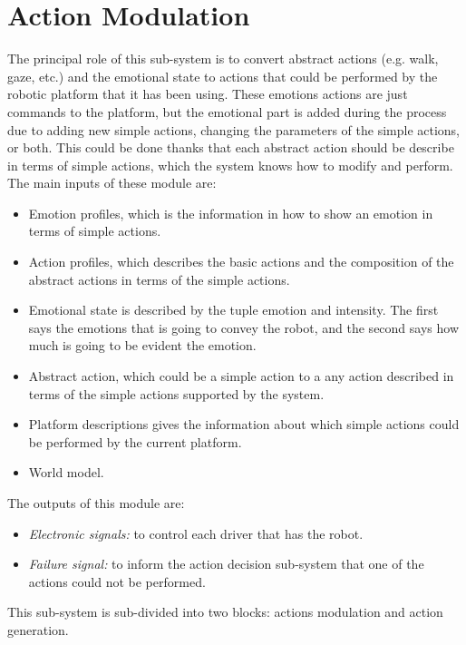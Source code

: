\section{Action Modulation}
The principal role of this sub-system is to convert abstract actions (e.g. walk, gaze, etc.) and the emotional state to actions that could be performed by the robotic platform that it has been using. These emotions actions are just commands to the platform, but the emotional part is added during the process due to adding new simple actions, changing the parameters of the simple actions, or both. This could be done thanks that each abstract action should be describe in terms of simple actions, which the system knows how to modify and perform. The main inputs of these module are:
\begin{itemize}
	\item Emotion profiles, which is the information in how to show an emotion in terms of simple actions.
	\item Action profiles, which describes the basic actions and the composition of the abstract actions in terms of the simple actions.
	\item Emotional state is described by the tuple emotion and intensity. The first says the emotions that is going to convey the robot, and the second says how much is going to be evident the emotion.
	\item Abstract action, which could be a simple action to a any action described in terms of the simple actions supported by the system.	
	\item Platform descriptions gives the information about which simple actions could be performed by the current platform.
	\item World model.
\end{itemize} 
The outputs of this module are:
\begin{itemize}
	\item \textit{Electronic signals:} to control each driver that has the robot.
	\item \textit{Failure signal:} to inform the action decision sub-system that one of the actions could not be performed.
\end{itemize}
This sub-system is sub-divided into two blocks: actions modulation and action generation.
